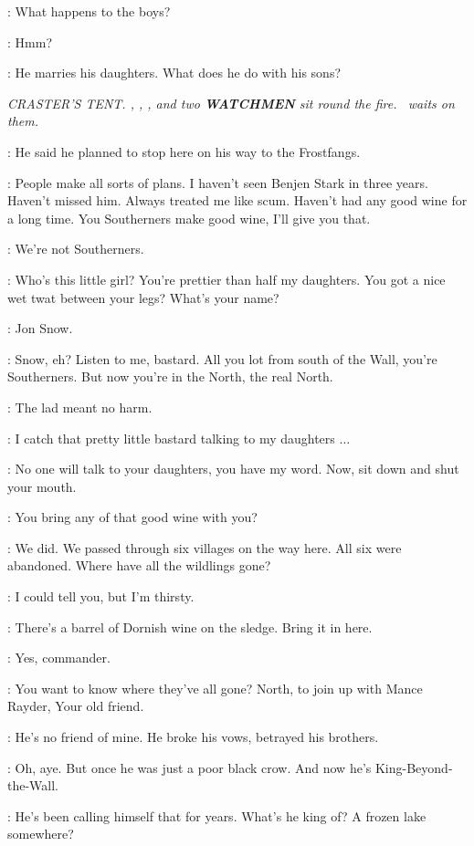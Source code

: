 \JON: What happens to the boys?

\EDD: Hmm?

\JON: He marries his daughters. What does he do with his sons?


\scene

\textit{CRASTER'S TENT. \JEOR, \CRASTER, \JON, and two \textbf{WATCHMEN} sit round the fire.  \GILLY ~waits on them.}

\JEOR: He said he planned to stop here on his way to the Frostfangs.

\CRASTER: People make all sorts of plans. I haven't seen Benjen Stark in three years. Haven't missed him. Always treated me like scum. Haven't had any good wine for a long time. You Southerners make good wine, I'll give you that.

\JON: We're not Southerners.

\CRASTER: Who's this little girl? You're prettier than half my daughters. You got a nice wet twat between your legs? What's your name?

\JON: Jon Snow.

\CRASTER: Snow, eh? Listen to me, bastard. All you lot from south of the Wall, you're Southerners. But now you're in the North, the real North.

\JEOR: The lad meant no harm.

\CRASTER: I catch that pretty little bastard talking to my daughters $\ldots$

\JEOR: No one will talk to your daughters, you have my word.  Now, sit down and shut your mouth.

\CRASTER: You bring any of that good wine with you?

\JEOR: We did. We passed through six villages on the way here. All six were abandoned. Where have all the wildlings gone?

\CRASTER: I could tell you, but I'm thirsty.

\JEOR: There's a barrel of Dornish wine on the sledge. Bring it in here.

\WATCHMANa:  Yes, commander.

\CRASTER: You want to know where they've all gone? North, to join up with Mance Rayder, Your old friend.

\JEOR: He's no friend of mine. He broke his vows, betrayed his brothers.

\CRASTER: Oh, aye. But once he was just a poor black crow. And now he's King-Beyond-the-Wall.

\JEOR: He's been calling himself that for years. What's he king of? A frozen lake somewhere?

